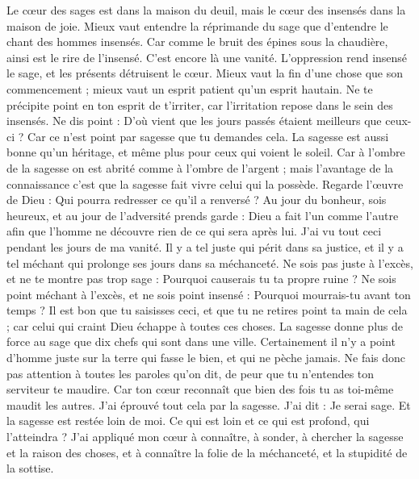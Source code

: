 \begin{multicols}{2}
Le cœur des sages est dans la maison du deuil, mais le cœur des insensés dans la maison de joie.
Mieux vaut entendre la réprimande du sage que d'entendre le chant des hommes insensés.
Car comme le bruit des épines sous la chaudière, ainsi est le rire de l’insensé. C’est encore là une vanité.
L'oppression rend insensé le sage, et les présents détruisent le cœur.
Mieux vaut la fin d'une chose que son commencement ; mieux vaut un esprit patient qu'un esprit hautain.
Ne te précipite point en ton esprit de t’irriter, car l’irritation repose dans le sein des insensés.
Ne dis point : D'où vient que les jours passés étaient meilleurs que ceux-ci ? Car ce n’est point par sagesse que tu demandes cela.
La sagesse est aussi bonne qu’un héritage, et même plus pour ceux qui voient le soleil.
Car à l'ombre de la sagesse on est abrité comme à l'ombre de l'argent ; mais l’avantage de la connaissance c’est que la sagesse fait vivre celui qui la possède.
Regarde l'œuvre de Dieu : Qui pourra redresser ce qu'il a renversé ?
Au jour du bonheur, sois heureux, et au jour de l'adversité prends garde : Dieu a fait l'un comme l'autre afin que l'homme ne découvre rien de ce qui sera après lui.
J'ai vu tout ceci pendant les jours de ma vanité. Il y a tel juste qui périt dans sa justice, et il y a tel méchant qui prolonge ses jours dans sa méchanceté.
Ne sois pas juste à l’excès, et ne te montre pas trop sage : Pourquoi causerais tu ta propre ruine ?
Ne sois point méchant à l’excès, et ne sois point insensé : Pourquoi mourrais-tu avant ton temps ?
Il est bon que tu saisisses ceci, et que tu ne retires point ta main de cela ; car celui qui craint Dieu échappe à toutes ces choses.
La sagesse donne plus de force au sage que dix chefs qui sont dans une ville.
Certainement il n'y a point d'homme juste sur la terre qui fasse le bien, et qui ne pèche jamais.
Ne fais donc pas attention à toutes les paroles qu'on dit, de peur que tu n'entendes ton serviteur te maudire.
Car ton cœur reconnaît que bien des fois tu as toi-même maudit les autres.
J'ai éprouvé tout cela par la sagesse. J'ai dit : Je serai sage. Et la sagesse est restée loin de moi.
Ce qui est loin et ce qui est profond, qui l’atteindra ?
J’ai appliqué mon cœur à connaître, à sonder, à chercher la sagesse et la raison des choses, et à connaître la folie de la méchanceté, et la stupidité de la sottise.

\end{multicols}
